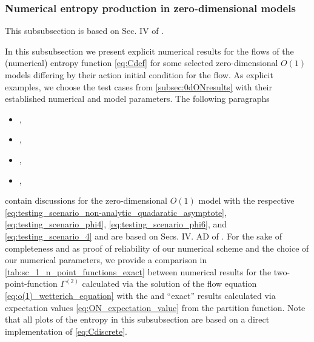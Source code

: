 \subsubsection{Numerical entropy production in zero-dimensional models}\label{subsubsec:0dO1entResults}
\begin{disclaimer}
	This subsubsection is based on Sec. IV of .
\end{disclaimer}
\label{subsubsec:0dO1numerical_tests}
In this subsubsection we present explicit numerical results for the \frg{} flows of the (numerical) entropy function \eqref{eq:Cdef} for some selected zero-dimensional $O(1)$ models differing by their action \dash{} \uv{} initial condition for the \frg{} flow.
As explicit examples, we choose the test cases from \cref{subsec:0dONresults} with their established numerical and model parameters.
The following paragraphs
\begin{itemize}
	\item {},
	\item {},
	\item {},
	\item {},
\end{itemize}
contain discussions for the zero-dimensional $O(1)$ model with the respective \ics{} \eqref{eq:testing_scenario_non-analytic_quadaratic_asymptote}, \eqref{eq:testing_scenario_phi4}, \eqref{eq:testing_scenario_phi6}, and \eqref{eq:testing_scenario_4} and are based on Secs. IV. A\dash{}D of .
For the sake of completeness and as proof of reliability of our numerical scheme and the choice of our numerical parameters, we provide a comparison in \cref{tab:sc_1_n_point_functions_exact} between numerical results for the \ipi{} two-point-function $\Gamma^{(2)}$ calculated via the solution of the flow equation \eqref{eq:o(1)_wetterich_equation} with the \ktScheme{} and ``exact'' results calculated via expectation values \eqref{eq:ON_expectation_value} from the partition function.
Note that all plots of the entropy in this subsubsection are based on a direct implementation of \cref{eq:Cdiscrete}.

